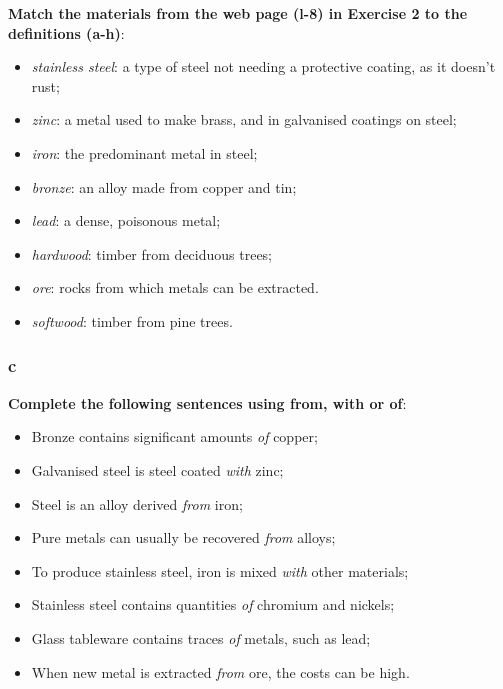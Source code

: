 \textbf{Match the materials from the web page (l-8) in Exercise 2 to the definitions (a-h)}:

\begin{itemize}

\item \textit{stainless steel}: a type of steel not needing a protective coating, as it doesn't rust;

\item \textit{zinc}: a metal used to make brass, and in galvanised coatings on steel;

\item \textit{iron}: the predominant metal in steel;

\item \textit{bronze}: an alloy made from copper and tin;

\item \textit{lead}: a dense, poisonous metal;

\item \textit{hardwood}: timber from deciduous trees;

\item \textit{ore}: rocks from which metals can be extracted.

\item \textit{softwood}: timber from pine trees.

\end{itemize}

\subsubsection{c}

\textbf{Complete the following sentences using from, with or of}:

\begin{itemize}

\item Bronze contains significant amounts \textit{of} copper;
\item Galvanised steel is steel coated \textit{with} zinc;
\item Steel is an alloy derived \textit{from} iron;
\item Pure metals can usually be recovered \textit{from} alloys;
\item To produce stainless steel, iron is mixed \textit{with} other materials;
\item Stainless steel contains quantities \textit{of} chromium and nickels;
\item Glass tableware contains traces \textit{of} metals, such as lead;
\item When new metal is extracted \textit{from} ore, the costs can be high.

\end{itemize}

